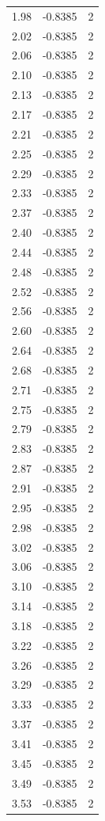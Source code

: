 \begin{longtable}{lrr}
  1.98 & -0.8385 & 2 \\
  2.02 & -0.8385 & 2 \\
  2.06 & -0.8385 & 2 \\
  2.10 & -0.8385 & 2 \\
  2.13 & -0.8385 & 2 \\
  2.17 & -0.8385 & 2 \\
  2.21 & -0.8385 & 2 \\
  2.25 & -0.8385 & 2 \\
  2.29 & -0.8385 & 2 \\
  2.33 & -0.8385 & 2 \\
  2.37 & -0.8385 & 2 \\
  2.40 & -0.8385 & 2 \\
  2.44 & -0.8385 & 2 \\
  2.48 & -0.8385 & 2 \\
  2.52 & -0.8385 & 2 \\
  2.56 & -0.8385 & 2 \\
  2.60 & -0.8385 & 2 \\
  2.64 & -0.8385 & 2 \\
  2.68 & -0.8385 & 2 \\
  2.71 & -0.8385 & 2 \\
  2.75 & -0.8385 & 2 \\
  2.79 & -0.8385 & 2 \\
  2.83 & -0.8385 & 2 \\
  2.87 & -0.8385 & 2 \\
  2.91 & -0.8385 & 2 \\
  2.95 & -0.8385 & 2 \\
  2.98 & -0.8385 & 2 \\
  3.02 & -0.8385 & 2 \\
  3.06 & -0.8385 & 2 \\
  3.10 & -0.8385 & 2 \\
  3.14 & -0.8385 & 2 \\
  3.18 & -0.8385 & 2 \\
  3.22 & -0.8385 & 2 \\
  3.26 & -0.8385 & 2 \\
  3.29 & -0.8385 & 2 \\
  3.33 & -0.8385 & 2 \\
  3.37 & -0.8385 & 2 \\
  3.41 & -0.8385 & 2 \\
  3.45 & -0.8385 & 2 \\
  3.49 & -0.8385 & 2 \\
  3.53 & -0.8385 & 2 \\

\end{longtable}
